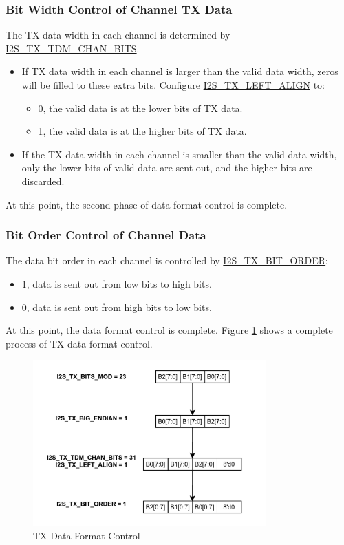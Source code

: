 \documentclass[main\_\_CN.tex]{subfiles}
\begin{document}
\subsubsection{Bit Width Control of Channel TX Data}
The TX data width in each channel is determined by \hyperref[fielddesc:I2STXTDMCHANBITS]{I2S\_TX\_TDM\_CHAN\_BITS}.

\begin{itemize}
\item If TX data width in each channel is larger than the valid data width, zeros will be filled to these extra bits. Configure  \hyperref[fielddesc:I2STXLEFTALIGN]{I2S\_TX\_LEFT\_ALIGN} to:
\begin{itemize}
\item 0, the valid data is at the lower bits of TX data.
\item 1, the valid data is at the higher bits of TX data.
\end{itemize}
\item If the TX data width in each channel is smaller than the valid data width, only the lower bits of valid data are sent out, and the higher bits are discarded.
\end{itemize}
At this point, the second phase of data format control is complete.

\subsubsection{Bit Order Control of Channel Data}
The data bit order in each channel is controlled by  \hyperref[fielddesc:I2STXBITORDER]{I2S\_TX\_BIT\_ORDER}:
\begin{itemize}
\item 1, data is sent out from low bits to high bits.
\item 0, data is sent out from high bits to low bits.
\end{itemize}
At this point, the data format control is complete. Figure  \ref{Figure:i2s_data_mode_control} shows a complete process of TX data format control.


\begin{figure}[H]
    \centering
    \includegraphics[width=0.8\textwidth]{03-I2S/figures/i2s_tx_data_config.png}
    \caption{TX Data Format Control}
    \label{Figure:i2s_data_mode_control}
\end{figure}
\end{document}
